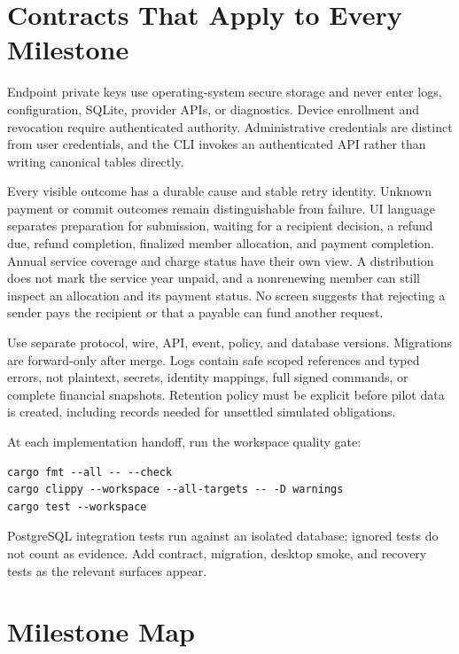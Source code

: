 \documentclass[11pt]{article}
\begin{document}
\section{Contracts That Apply to Every Milestone}

Endpoint private keys use operating-system secure storage and never enter logs,
configuration, SQLite, provider APIs, or diagnostics. Device enrollment and
revocation require authenticated authority. Administrative credentials are distinct
from user credentials, and the CLI invokes an authenticated API rather than
writing canonical tables directly.

Every visible outcome has a durable cause and stable retry identity. Unknown
payment or commit outcomes remain distinguishable from failure. UI language
separates preparation for submission, waiting for a recipient decision, a refund
due, refund completion, finalized member allocation, and payment completion.
Annual service coverage and charge status have their own view. A distribution
does not mark the service year unpaid, and a nonrenewing member can still
inspect an allocation and its payment status. No screen suggests that
rejecting a sender pays the recipient or that a payable can fund another request.

Use separate protocol, wire, API, event, policy, and database versions. Migrations
are forward-only after merge. Logs contain safe scoped references and typed
errors, not plaintext, secrets, identity mappings, full signed commands, or
complete financial snapshots. Retention policy must be explicit before pilot
data is created, including records needed for unsettled simulated obligations.

At each implementation handoff, run the workspace quality gate:
\begin{lstlisting}[language={}]
cargo fmt --all -- --check
cargo clippy --workspace --all-targets -- -D warnings
cargo test --workspace
\end{lstlisting}
PostgreSQL integration tests run against an isolated database; ignored tests do
not count as evidence. Add contract, migration, desktop smoke, and recovery tests
as the relevant surfaces appear.

\section{Milestone Map}
\end{document}
